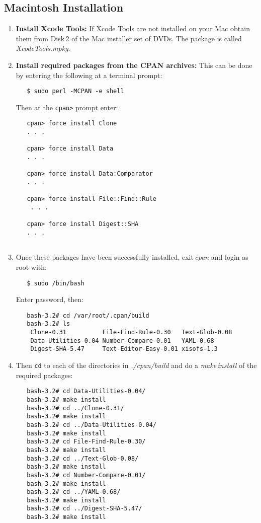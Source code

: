 \documentclass[12pt]{article}
\begin{document}
\subsection*{Macintosh Installation}
\begin{enumerate}
\item {\bf Install Xcode Tools:} If Xcode Tools are not installed on your Mac obtain them from Disk\,2 of the Mac installer set of DVDs. The package is called\,{\it XcodeTools.mpkg}.

\item {\bf Install required packages from the CPAN archives:} This can be done by entering the following at a terminal prompt:
\begin{verbatim}
   $ sudo perl -MCPAN -e shell
\end{verbatim}
Then at the {\tt cpan>} prompt enter:
\begin{verbatim}
   cpan> force install Clone
   . . . 

   cpan> force install Data
   . . . 

   cpan> force install Data:Comparator
   . . . 

   cpan> force install File::Find::Rule
    . . .

   cpan> force install Digest::SHA
   . . . 
   
\end{verbatim}

\item Once these packages have been successfully installed, exit\,{\it cpan} and login as root with:
\begin{verbatim}
   $ sudo /bin/bash
\end{verbatim}
Enter password, then:
\begin{verbatim}
   bash-3.2# cd /var/root/.cpan/build
   bash-3.2# ls
    Clone-0.31          File-Find-Rule-0.30   Text-Glob-0.08
    Data-Utilities-0.04 Number-Compare-0.01   YAML-0.68
    Digest-SHA-5.47     Text-Editor-Easy-0.01 xisofs-1.3
\end{verbatim}

\item Then {\tt cd} to each of the directories in {\it ./cpan/build} and do a {\it make\,install} of the required packages:
\begin{verbatim}
   bash-3.2# cd Data-Utilities-0.04/
   bash-3.2# make install
   bash-3.2# cd ../Clone-0.31/
   bash-3.2# make install
   bash-3.2# cd ../Data-Utilities-0.04/
   bash-3.2# make install
   bash-3.2# cd File-Find-Rule-0.30/
   bash-3.2# make install
   bash-3.2# cd ../Text-Glob-0.08/
   bash-3.2# make install
   bash-3.2# cd Number-Compare-0.01/
   bash-3.2# make install
   bash-3.2# cd ../YAML-0.68/
   bash-3.2# make install
   bash-3.2# cd ../Digest-SHA-5.47/
   bash-3.2# make install
\end{verbatim}

\end{enumerate}
\end{document}

